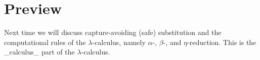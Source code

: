 \section{Preview}

Next time we will discuss capture-avoiding (safe) substitution and the computational rules of the $\lambda$-calculus, namely $\alpha$-, $\beta$-, and $\eta$-reduction. This is the _calculus_ part of the $\lambda$-calculus.

\nocite{Barendregt84}
